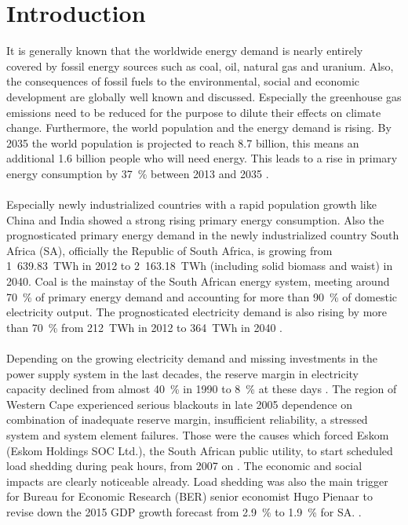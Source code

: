 \documentclass[Master,MEE,english]{twbook}%
\begin{document}
\chapter{Introduction}
%
It is generally known that the worldwide energy demand is nearly entirely covered by fossil energy sources such as coal, oil, natural gas and uranium. Also, the consequences of fossil fuels to the environmental, social and economic development are globally well known and discussed. Especially the greenhouse gas emissions need to be reduced for the purpose to dilute their effects on climate change. Furthermore, the world population and the energy demand is rising. By 2035 the world population is projected to reach 8.7 billion, this means an additional 1.6 billion people who will need energy. This leads to a rise in primary energy consumption by 37~\% between 2013 and 2035 \cite{BP2015a}. \\
\\
Especially newly industrialized countries with a rapid population growth like China and India showed a strong rising primary energy consumption. Also the prognosticated primary energy demand in the newly industrialized country South Africa (SA), officially the Republic of South Africa, is growing from 1~639.83~TWh in 2012 to 2~163.18~TWh (including solid biomass and waist) in 2040. Coal is the mainstay of the South African energy system, meeting around 70~\% of primary energy demand and accounting for more than 90~\% of domestic electricity output. The prognosticated electricity demand is also rising by more than 70~\% from 212~TWh in 2012 to 364~TWh in 2040 \cite{IEA2014f}.\\
\\
Depending on the growing electricity demand and missing investments in the power supply system in the last decades, the reserve margin in electricity capacity declined from almost 40~\% in 1990 to 8~\% at these days \cite{Trollip2014,Eskom2015}. The region of Western Cape experienced serious blackouts in late 2005 dependence on combination of inadequate reserve margin, insufficient reliability, a stressed system and system element failures. Those were the causes which forced Eskom (Eskom Holdings SOC Ltd.), the South African public utility, to start scheduled load shedding during peak hours, from 2007 on \cite{Trollip2014}. The economic and social impacts are clearly noticeable already. Load shedding was also the main trigger for Bureau for Economic Research (BER) senior economist Hugo Pienaar to revise down the 2015 GDP growth forecast from 2.9~\% to 1.9~\% for SA. \cite{Bisseker2015}.\\
\end{document}
